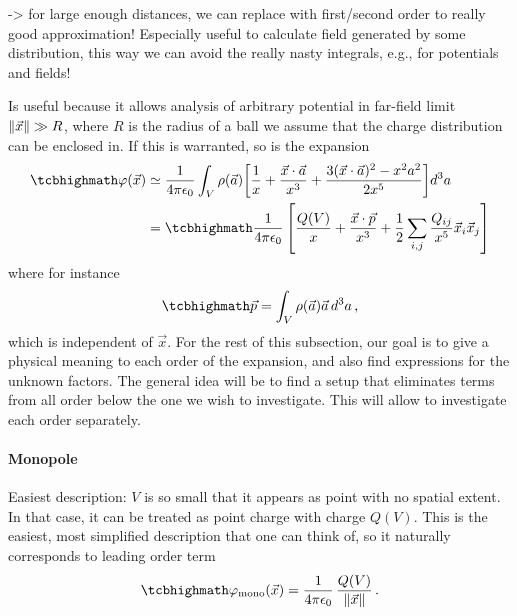 \documentclass[../class_mech_main.tex]{subfiles}
\DeclareMathOperator{\fpeps}{\frac{1}{4 \pi \epsilon_0}}
\begin{document}

-> for large enough distances, we can replace with first/second order to really good approximation! Especially useful to calculate field generated by some distribution, this way we can avoid the really nasty integrals, e.g., for potentials and fields!


Is useful because it allows analysis of arbitrary potential in far-field limit $\norm{\vec{x}} \gg R$, where $R$ is the radius of a ball we assume that the charge distribution can be enclosed in. If this is warranted, so is the expansion
\begin{align}
    \eqbox{
        \varphi(\vec{x})
    }
    &\simeq \fpeps \int_V \rho(\vec{a}) \qty[\frac{1}{x} + \frac{\vec{x} \cdot \vec{a}}{x^3} + \frac{3 (\vec{x} \cdot \vec{a})^2 - x^2 a^2}{2 x^5}] d^3a
    \\
    &= 
    \eqbox{
        \fpeps \qty[\frac{Q(V)}{x} + \frac{\vec{x} \cdot \vec{p}}{x^3} + \frac{1}{2} \sum_{i, j} \frac{Q_{ij}}{x^5} \vec{x}_i \vec{x}_j]
    }
\end{align}
where for instance
\begin{equation}
    \eqbox{
        \vec{p} = \int_V \rho(\vec{a}) \vec{a} \, d^3a
    } \, ,
\end{equation}
which is independent of $\vec{x}$. For the rest of this subsection, our goal is to give a physical meaning to each order of the expansion, and also find expressions for the unknown factors. The general idea will be to find a setup that eliminates terms from all order below the one we wish to investigate. This will allow to investigate each order separately.



            \paragraph{Monopole}
Easiest description: $V$ is so small that it appears as point with no spatial extent. In that case, it can be treated as point charge with charge $Q(V)$. This is the easiest, most simplified description that one can think of, so it naturally corresponds to leading order term
\begin{equation}
    \eqbox{
        \varphi_\mathrm{mono}(\vec{x}) = \fpeps \frac{Q(V)}{\norm{\vec{x}}}
    } \, .
\end{equation}
\end{document}
